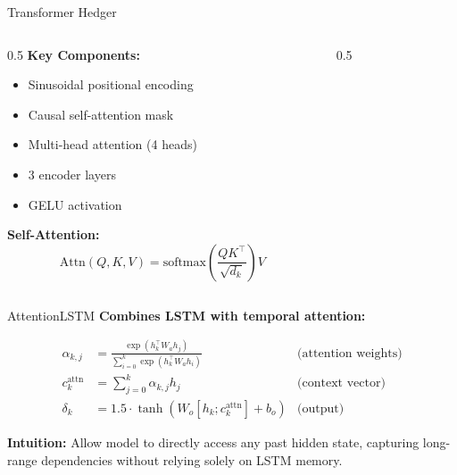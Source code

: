 \documentclass[aspectratio=169,11pt]{beamer}
\begin{document}
\begin{frame}{Transformer Hedger}
\begin{columns}
\begin{column}{0.5\textwidth}
\textbf{Key Components:}
\begin{itemize}
    \item Sinusoidal positional encoding
    \item Causal self-attention mask
    \item Multi-head attention (4 heads)
    \item 3 encoder layers
    \item GELU activation
\end{itemize}

\vspace{0.3cm}
\textbf{Self-Attention:}
\begin{equation*}
\text{Attn}(Q,K,V) = \text{softmax}\left(\frac{QK^\top}{\sqrt{d_k}}\right)V
\end{equation*}
\end{column}
\begin{column}{0.5\textwidth}
\end{column}
\end{columns}
\end{frame}

\begin{frame}{AttentionLSTM}
\textbf{Combines LSTM with temporal attention:}

\begin{align*}
\alpha_{k,j} &= \frac{\exp(h_k^\top W_a h_j)}{\sum_{i=0}^k \exp(h_k^\top W_a h_i)} & \text{(attention weights)} \\
c_k^{\text{attn}} &= \sum_{j=0}^k \alpha_{k,j} h_j & \text{(context vector)} \\
\delta_k &= 1.5 \cdot \tanh(W_o [h_k; c_k^{\text{attn}}] + b_o) & \text{(output)}
\end{align*}

\vspace{0.3cm}
\textbf{Intuition:} Allow model to directly access any past hidden state, capturing long-range dependencies without relying solely on LSTM memory.
\end{frame}
\end{document}
